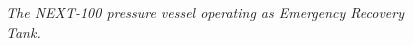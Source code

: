 \begin{figure}[hpt!]
    \bigskip
    \begin{center}\leavevmode
        \caption{\textit{The NEXT-100 pressure vessel operating as Emergency Recovery Tank.}}
        \label{fig.N100}
    \end{center}
\end{figure}


